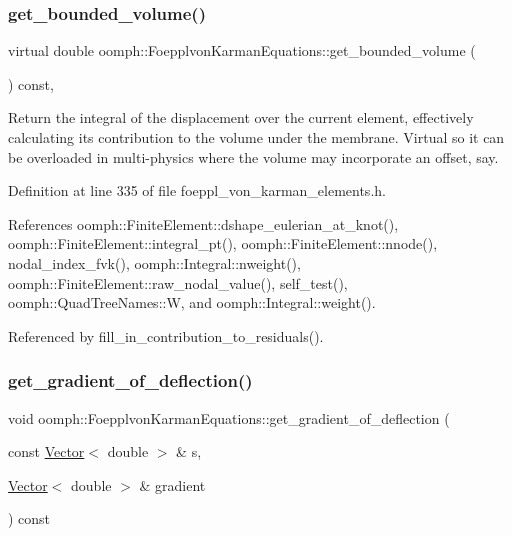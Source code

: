 \subsubsection{\texorpdfstring{get\+\_\+bounded\+\_\+volume()}{get\_bounded\_volume()}}
{\footnotesize\ttfamily virtual double oomph\+::\+Foepplvon\+Karman\+Equations\+::get\+\_\+bounded\+\_\+volume (\begin{DoxyParamCaption}{ }\end{DoxyParamCaption}) const\hspace{0.3cm}{\ttfamily [inline]}, {\ttfamily [virtual]}}



Return the integral of the displacement over the current element, effectively calculating its contribution to the volume under the membrane. Virtual so it can be overloaded in multi-\/physics where the volume may incorporate an offset, say. 



Definition at line 335 of file foeppl\+\_\+von\+\_\+karman\+\_\+elements.\+h.



References oomph\+::\+Finite\+Element\+::dshape\+\_\+eulerian\+\_\+at\+\_\+knot(), oomph\+::\+Finite\+Element\+::integral\+\_\+pt(), oomph\+::\+Finite\+Element\+::nnode(), nodal\+\_\+index\+\_\+fvk(), oomph\+::\+Integral\+::nweight(), oomph\+::\+Finite\+Element\+::raw\+\_\+nodal\+\_\+value(), self\+\_\+test(), oomph\+::\+Quad\+Tree\+Names\+::W, and oomph\+::\+Integral\+::weight().



Referenced by fill\+\_\+in\+\_\+contribution\+\_\+to\+\_\+residuals().

\mbox{\label{classoomph_1_1FoepplvonKarmanEquations_a1fb7d4b7782b2d04f49b9ed508ec00e6}} 
\subsubsection{\texorpdfstring{get\+\_\+gradient\+\_\+of\+\_\+deflection()}{get\_gradient\_of\_deflection()}}
{\footnotesize\ttfamily void oomph\+::\+Foepplvon\+Karman\+Equations\+::get\+\_\+gradient\+\_\+of\+\_\+deflection (\begin{DoxyParamCaption}\item[{const \hyperlink{classoomph_1_1Vector}{Vector}$<$ double $>$ \&}]{s,  }\item[{\hyperlink{classoomph_1_1Vector}{Vector}$<$ double $>$ \&}]{gradient }\end{DoxyParamCaption}) const\hspace{0.3cm}{\ttfamily [inline]}}



